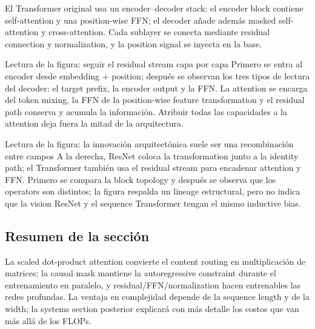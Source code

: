 El Transformer original usa un encoder--decoder stack: el encoder block contiene self-attention y una position-wise FFN; el decoder añade además masked self-attention y cross-attention. Cada sublayer se conecta mediante residual connection y normalization, y la position signal se inyecta en la base.


\begin{knowledgebox}{Lectura de la figura: seguir el residual stream capa por capa}
Primero se entra al encoder desde embedding + position; después se observan los tres tipos de lectura del decoder: el target prefix, la encoder output y la FFN. La attention se encarga del token mixing, la FFN de la position-wise feature transformation y el residual path conserva y acumula la información. Atribuir todas las capacidades a la attention deja fuera la mitad de la arquitectura.
\end{knowledgebox}


\begin{knowledgebox}{Lectura de la figura: la innovación arquitectónica suele ser una recombinación entre campos}
A la derecha, ResNet coloca la transformation junto a la identity path; el Transformer también usa el residual stream para encadenar attention y FFN. Primero se compara la block topology y después se observa que los operators son distintos; la figura respalda un lineage estructural, pero no indica que la vision ResNet y el sequence Transformer tengan el mismo inductive bias.
\end{knowledgebox}


\subsection{Resumen de la sección}

La scaled dot-product attention convierte el content routing en multiplicación de matrices; la causal mask mantiene la autoregressive constraint durante el entrenamiento en paralelo, y residual/FFN/normalization hacen entrenables las redes profundas. La ventaja en complejidad depende de la sequence length y de la width; la systems section posterior explicará con más detalle los costos que van más allá de los FLOPs.
